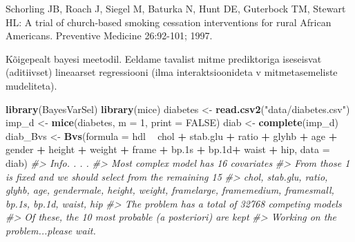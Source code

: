 \documentclass[]{book}
\newenvironment{Shaded}{\begin{snugshade}}{\end{snugshade}}
\newcommand{\KeywordTok}[1]{\textcolor[rgb]{0.13,0.29,0.53}{\textbf{#1}}}
\newcommand{\DataTypeTok}[1]{\textcolor[rgb]{0.13,0.29,0.53}{#1}}
\newcommand{\DecValTok}[1]{\textcolor[rgb]{0.00,0.00,0.81}{#1}}
\newcommand{\StringTok}[1]{\textcolor[rgb]{0.31,0.60,0.02}{#1}}
\newcommand{\CommentTok}[1]{\textcolor[rgb]{0.56,0.35,0.01}{\textit{#1}}}
\newcommand{\OtherTok}[1]{\textcolor[rgb]{0.56,0.35,0.01}{#1}}
\newcommand{\OperatorTok}[1]{\textcolor[rgb]{0.81,0.36,0.00}{\textbf{#1}}}
\newcommand{\NormalTok}[1]{#1}
\begin{document}
Schorling JB, Roach J, Siegel M, Baturka N, Hunt DE, Guterbock TM,
Stewart HL: A trial of church-based smoking cessation interventions for
rural African Americans. Preventive Medicine 26:92-101; 1997.

Kõigepealt bayesi meetodil. Eeldame tavalist mitme prediktoriga
iseseisvat (aditiivset) lineaarset regressiooni (ilma interaktsioonideta
v mitmetasemeliste mudeliteta).

\begin{Shaded}
\begin{Highlighting}[]
\KeywordTok{library}\NormalTok{(BayesVarSel)}
\KeywordTok{library}\NormalTok{(mice)}
\NormalTok{diabetes <-}\StringTok{ }\KeywordTok{read.csv2}\NormalTok{(}\StringTok{"data/diabetes.csv"}\NormalTok{)}
\NormalTok{imp_d <-}\StringTok{ }\KeywordTok{mice}\NormalTok{(diabetes, }\DataTypeTok{m =} \DecValTok{1}\NormalTok{, }\DataTypeTok{print =} \OtherTok{FALSE}\NormalTok{)}
\NormalTok{diab <-}\StringTok{ }\KeywordTok{complete}\NormalTok{(imp_d) }
\NormalTok{diab_Bvs <-}\StringTok{ }\KeywordTok{Bvs}\NormalTok{(}\DataTypeTok{formula =}\NormalTok{ hdl }\OperatorTok{~}\StringTok{ }\NormalTok{chol }\OperatorTok{+}\StringTok{ }\NormalTok{stab.glu }\OperatorTok{+}\StringTok{ }\NormalTok{ratio }\OperatorTok{+}\StringTok{ }\NormalTok{glyhb }\OperatorTok{+}\StringTok{ }\NormalTok{age }\OperatorTok{+}\StringTok{ }\NormalTok{gender }\OperatorTok{+}\StringTok{ }\NormalTok{height }\OperatorTok{+}\StringTok{ }\NormalTok{weight }\OperatorTok{+}\StringTok{ }\NormalTok{frame }\OperatorTok{+}\StringTok{ }\NormalTok{bp.1s }\OperatorTok{+}\StringTok{ }\NormalTok{bp.1d}\OperatorTok{+}\StringTok{ }\NormalTok{waist }\OperatorTok{+}\StringTok{ }\NormalTok{hip, }\DataTypeTok{data =}\NormalTok{ diab)}
\CommentTok{#> Info. . . .}
\CommentTok{#> Most complex model has 16 covariates}
\CommentTok{#> From those 1 is fixed and we should select from the remaining 15 }
\CommentTok{#> chol, stab.glu, ratio, glyhb, age, gendermale, height, weight, framelarge, framemedium, framesmall, bp.1s, bp.1d, waist, hip}
\CommentTok{#> The problem has a total of 32768 competing models}
\CommentTok{#> Of these, the  10 most probable (a posteriori) are kept}
\CommentTok{#> Working on the problem...please wait.}
\end{Highlighting}
\end{Shaded}
\end{document}
